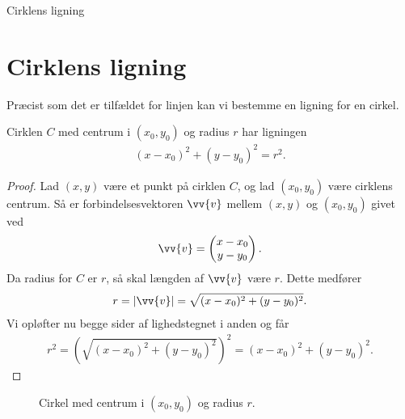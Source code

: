 
\begin{center}
\Huge
Cirklens ligning
\end{center}

\section*{Cirklens ligning}
Præcist som det er tilfældet for linjen kan vi bestemme en ligning for en cirkel. 
\begin{setn}
	Cirklen $C$ med centrum i $(x_0,y_0)$ og radius $r$ har ligningen
	\begin{align*}
		(x-x_0)^2 + (y-y_0)^2 = r^2.
	\end{align*}
\end{setn}
\begin{proof}
	Lad $(x,y)$ være et punkt på cirklen $C$, og lad $(x_0,y_0)$ være cirklens centrum. Så er
	forbindelsesvektoren $\vv{v}$ mellem $(x,y)$ og $(x_0,y_0)$ givet ved
	\begin{align*}
		\vv{v} = 
		\begin{pmatrix}
			x-x_0 \\
			y-y_0
		\end{pmatrix}.
	\end{align*}
	Da radius for $C$ er $r$, så skal længden af $\vv{v}$ være $r$. Dette medfører
	\begin{align*}
		r = |\vv{v}| = \sqrt{(x-x_0)^2+(y-y_0)^2}. 
	\end{align*}
	Vi opløfter nu begge sider af lighedstegnet i anden og får
	\begin{align*}
		r^2 = \left(\sqrt{(x-x_0)^2+(y-y_0)^2}\right)^2 = (x-x_0)^2 + (y-y_0)^2.
	\end{align*}
\end{proof}

\begin{figure}[H]
	\centering
	\caption{Cirkel med centrum i $(x_0,y_0)$ og radius $r$.}
\end{figure}

